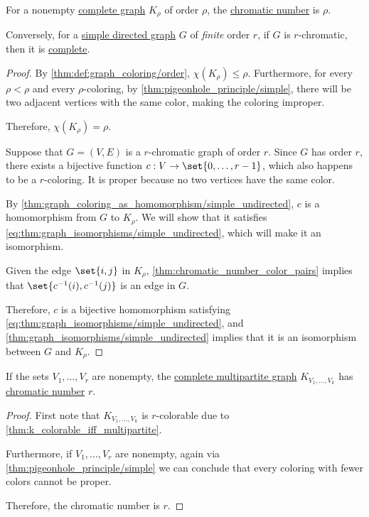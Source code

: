 \begin{proposition}\label{thm:complete_graph_chromatic_number}
  For a nonempty \hyperref[def:complete_graph]{complete graph} \( K_\rho \) of order \( \rho \), the \hyperref[def:graph_chromatic_number]{chromatic number} is \( \rho \).

  Conversely, for a \hyperref[def:directed_graph]{simple directed graph} \( G \) of \emph{finite} order \( r \), if \( G \) is \( r \)-chromatic, then it is \hyperref[def:complete_subgraph]{complete}.
\end{proposition}
\begin{proof}
  \SufficiencySubProof By \cref{thm:def:graph_coloring/order}, \( \chi(K_\rho) \leq \rho \). Furthermore, for every \( \rho < \rho \) and every \( \rho \)-coloring, by \cref{thm:pigeonhole_principle/simple}, there will be two adjacent vertices with the same color, making the coloring improper.

  Therefore, \( \chi(K_\rho) = \rho \).

  \NecessitySubProof Suppose that \( G = (V, E) \) is a \( r \)-chromatic graph of order \( r \). Since \( G \) has order \( r \), there exists a bijective function \( c: V \to \set{ 0, \ldots, r - 1 } \), which also happens to be a \( r \)-coloring. It is proper because no two vertices have the same color.

  By \cref{thm:graph_coloring_as_homomorphism/simple_undirected}, \( c \) is a homomorphism from \( G \) to \( K_\rho \). We will show that it satisfies \eqref{eq:thm:graph_isomorphisms/simple_undirected}, which will make it an isomorphism.

  Given the edge \( \set{ i, j } \) in \( K_\rho \), \cref{thm:chromatic_number_color_pairs} implies that \( \set{ c^{-1}(i), c^{-1}(j) } \) is an edge in \( G \).

  Therefore, \( c \) is a bijective homomorphism satisfying \eqref{eq:thm:graph_isomorphisms/simple_undirected}, and \cref{thm:graph_isomorphisms/simple_undirected} implies that it is an isomorphism between \( G \) and \( K_\rho \).
\end{proof}

\begin{proposition}\label{thm:complete_multipartite_graph_chromatic_number}
  If the sets \( V_1, \ldots, V_r \) are nonempty, the \hyperref[def:complete_multipartite_graph]{complete multipartite graph} \( K_{V_1,\ldots,V_k} \) has \hyperref[def:graph_chromatic_number]{chromatic number} \( r \).
\end{proposition}
\begin{proof}
  First note that \( K_{V_1, \ldots, V_k} \) is \( r \)-colorable due to \cref{thm:k_colorable_iff_multipartite}.

  Furthermore, if \( V_1, \ldots, V_r \) are nonempty, again via \cref{thm:pigeonhole_principle/simple} we can conclude that every coloring with fewer colors cannot be proper.

  Therefore, the chromatic number is \( r \).
\end{proof}


